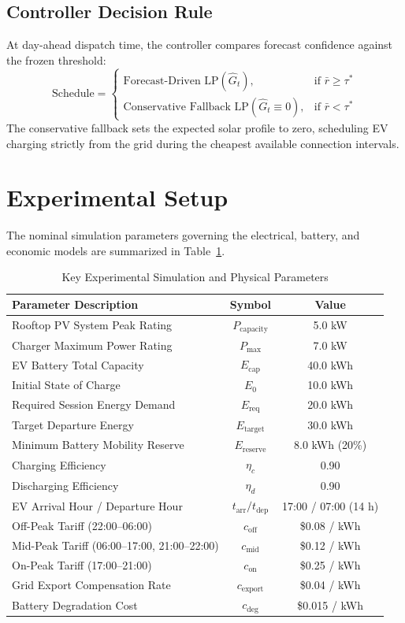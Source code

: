 \documentclass[conference]{IEEEtran}
\begin{document}
\subsection{Controller Decision Rule}
At day-ahead dispatch time, the controller compares forecast confidence against the frozen threshold:
\begin{equation}
\text{Schedule} = \begin{cases}
\text{Forecast-Driven LP}(\hat{G}_t), & \text{if } \bar{r} \ge \tau^* \\
\text{Conservative Fallback LP}(\hat{G}_t \equiv 0), & \text{if } \bar{r} < \tau^*
\end{cases}
\end{equation}
The conservative fallback sets the expected solar profile to zero, scheduling EV charging strictly from the grid during the cheapest available connection intervals.

\section{Experimental Setup}

The nominal simulation parameters governing the electrical, battery, and economic models are summarized in Table~\ref{tab:params}.

\begin{table}[htbp]
\caption{Key Experimental Simulation and Physical Parameters}
\label{tab:params}
\centering
\begin{tabular}{lcc}
\toprule
\textbf{Parameter Description} & \textbf{Symbol} & \textbf{Value} \\
\midrule
Rooftop PV System Peak Rating & $P_{\text{capacity}}$ & 5.0 kW \\
Charger Maximum Power Rating & $P_{\max}$ & 7.0 kW \\
EV Battery Total Capacity & $E_{\text{cap}}$ & 40.0 kWh \\
Initial State of Charge & $E_0$ & 10.0 kWh \\
Required Session Energy Demand & $E_{\text{req}}$ & 20.0 kWh \\
Target Departure Energy & $E_{\text{target}}$ & 30.0 kWh \\
Minimum Battery Mobility Reserve & $E_{\text{reserve}}$ & 8.0 kWh (20\%) \\
Charging Efficiency & $\eta_c$ & 0.90 \\
Discharging Efficiency & $\eta_d$ & 0.90 \\
EV Arrival Hour / Departure Hour & $t_{\text{arr}} / t_{\text{dep}}$ & 17:00 / 07:00 (14 h) \\
Off-Peak Tariff (22:00--06:00) & $c_{\text{off}}$ & \$0.08 / kWh \\
Mid-Peak Tariff (06:00--17:00, 21:00--22:00) & $c_{\text{mid}}$ & \$0.12 / kWh \\
On-Peak Tariff (17:00--21:00) & $c_{\text{on}}$ & \$0.25 / kWh \\
Grid Export Compensation Rate & $c_{\text{export}}$ & \$0.04 / kWh \\
Battery Degradation Cost & $c_{\text{deg}}$ & \$0.015 / kWh \\
\bottomrule
\end{tabular}
\end{table}
\end{document}
